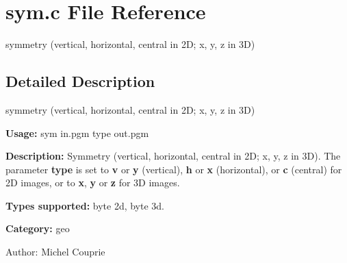 \section{sym.c File Reference}
\label{sym_8c}
symmetry (vertical, horizontal, central in 2D; x, y, z in 3D) 



\subsection{Detailed Description}
symmetry (vertical, horizontal, central in 2D; x, y, z in 3D) 

{\bf Usage:} sym in.pgm type out.pgm

{\bf Description:} Symmetry (vertical, horizontal, central in 2D; x, y, z in 3D). The parameter {\bf type} is set to {\bf v} or {\bf y} (vertical), {\bf h} or {\bf x} (horizontal), or {\bf c} (central) for 2D images, or to {\bf x}, {\bf y} or {\bf z} for 3D images.

{\bf Types supported:} byte 2d, byte 3d.

{\bf Category:} geo

\begin{Desc}
\item[Author:]Michel Couprie \end{Desc}
